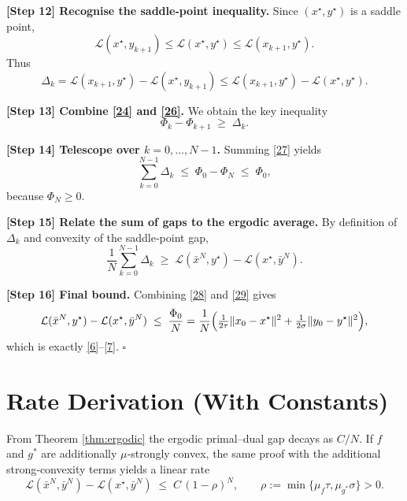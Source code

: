 \documentclass{article}
\newcommand{\norm}[1]{\|#1\|}
\begin{document}
\noindent\textbf{[Step 12] Recognise the saddle‑point inequality.}  
Since $(x^{\star},y^{\star})$ is a saddle point,
\[
\mathcal L(x^{\star},y_{k+1})\le \mathcal L(x^{\star},y^{\star})\le
\mathcal L(x_{k+1},y^{\star}).
\tag{25}
\]
Thus
\[
\Delta_{k}= \mathcal L(x_{k+1},y^{\star})-\mathcal L(x^{\star},y_{k+1})
\le
\mathcal L(x_{k+1},y^{\star})-\mathcal L(x^{\star},y^{\star}).
\tag{26}
\]

\noindent\textbf{[Step 13] Combine \eqref{24} and \eqref{26}.}  
We obtain the key inequality
\[
\Phi_{k}-\Phi_{k+1}\;\ge\;\Delta_{k}.
\tag{27}
\]

\noindent\textbf{[Step 14] Telescope over $k=0,\dots,N-1$.}
Summing \eqref{27} yields
\[
\sum_{k=0}^{N-1}\Delta_{k}\;\le\;\Phi_{0}-\Phi_{N}
\;\le\;\Phi_{0},
\tag{28}
\]
because $\Phi_{N}\ge0$.

\noindent\textbf{[Step 15] Relate the sum of gaps to the ergodic average.}
By definition of $\Delta_{k}$ and convexity of the saddle‑point gap,
\[
\frac{1}{N}\sum_{k=0}^{N-1}\Delta_{k}
\;\ge\;
\mathcal L(\bar x^{N},y^{\star})-\mathcal L(x^{\star},\bar y^{N}).
\tag{29}
\]

\noindent\textbf{[Step 16] Final bound.}  
Combining \eqref{28} and \eqref{29} gives
\[
\mathcal L(\bar x^{N},y^{\star})-\mathcal L(x^{\star},\bar y^{N})
\;\le\;
\frac{\Phi_{0}}{N}
=
\frac{1}{N}\Bigl(\tfrac{1}{2\tau}\norm{x_{0}-x^{\star}}^{2}
                +\tfrac{1}{2\sigma}\norm{y_{0}-y^{\star}}^{2}\Bigr),
\]
which is exactly \eqref{6}–\eqref{7}. \hfill $\square$

\section*{Rate Derivation (With Constants)}
From Theorem \ref{thm:ergodic} the ergodic primal–dual gap decays as $C/N$.
If $f$ and $g^{*}$ are additionally $\mu$‑strongly convex, the same proof with the additional strong‑convexity terms yields a linear rate
\[
\mathcal L(\bar x^{N},\bar y^{N})-\mathcal L(x^{\star},\bar y^{N})
\;\le\;
C\,(1-\rho)^{N},
\qquad 
\rho:=\min\{\mu_{f}\tau,\mu_{g^{*}}\sigma\}>0.
\tag{30}
\]
\end{document}
